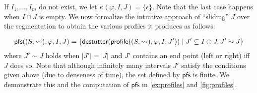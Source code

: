 If $I_1, \ldots, I_m$ do not exist, we let $\kappa(\varphi, I, J) = \{\epsilon\}$.
Note that the last case happens when $I \cap J$ is empty.
We now formalize the intuitive approach of ``sliding'' $J$ over the segmentation to obtain the 
various profiles it produces as follows:

\small
\begin{align*}
	\mathsf{pfs}((S,{\hb}), \varphi, I, J) = \{\destutter(\mathsf{profile}((S,{\hb}), \varphi, I, J')) \st J' \subseteq I \oplus J, J' \sim J\}
\end{align*}
\normalsize
where $J' \sim J$ holds when $|J'| = |J|$ and $J'$ contains an end point (left or right) iff $J$ does so.
Note that although infinitely many intervals $J'$ satisfy the conditions given above (due to denseness of time), the set defined by $\mathsf{pfs}$ is finite.
We demonstrate this and the computation of $\mathsf{pfs}$ in \cref{ex:profiles} and \cref{fig:profiles}.

